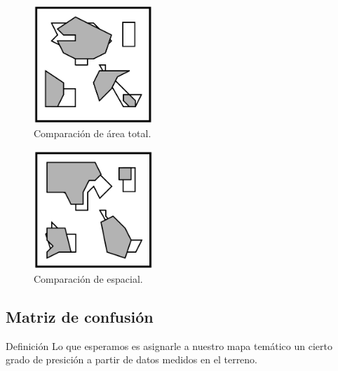 \documentclass[handout]{beamer}
\begin{document}
\begin{frame}{\subsecname}
  \begin{figure}
  \includegraphics[width=0.4\textwidth]{imagenes/area-v.png}
  \caption{Comparación de área total.}
  \end{figure}
\end{frame}

\begin{frame}{\subsecname}
  \begin{figure}
  \includegraphics[width=0.4\textwidth]{imagenes/area-e.png}
  \caption{Comparación de espacial.}
  \end{figure}
\end{frame}

\subsection{Matriz de confusión}
\begin{frame}{\subsecname}
\begin{block}{Definición}
  Lo que esperamos es asignarle a nuestro mapa temático un cierto grado de presición a partir de datos medidos en el terreno.
\end{block}
\end{frame}
\end{document}
